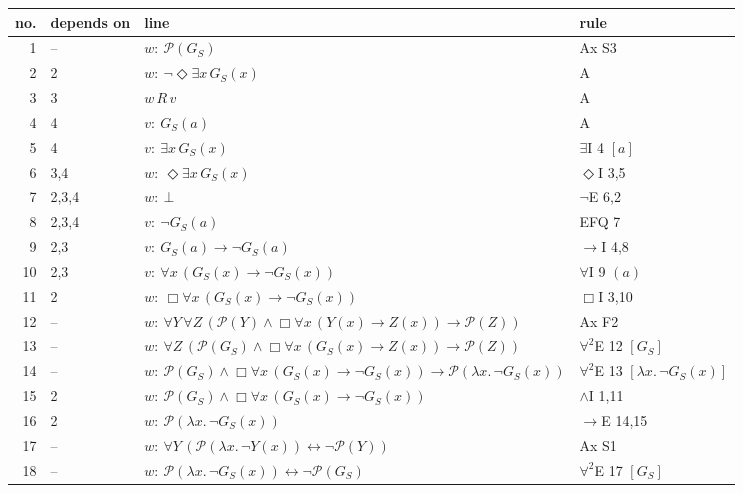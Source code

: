 {\footnotesize\setlength{\tabcolsep}{4pt}
\begin{longtable}{@{}r>{\raggedright}p{}p{}>{\raggedright\arraybackslash}p{}@{}}\toprule
no. & depends on & line & rule\\\midrule\endhead
1 & -- & $w:\ \mathcal{P}(G_{\!S})$ & Ax S3\\
2 & 2 & $w:\ \neg \Diamond \exists x\, G_{\!S}(x)$ & A\\
3 & 3 & $w\,R\,v$ & A\\
4 & 4 & $v:\ G_{\!S}(a)$ & A\\
5 & 4 & $v:\ \exists x\, G_{\!S}(x)$ & $\exists$I 4 $[a]$\\
6 & 3,4 & $w:\ \Diamond \exists x\, G_{\!S}(x)$ & $\Diamond$I 3,5\\
7 & 2,3,4 & $w:\ \bot$ & $\neg$E 6,2\\
8 & 2,3,4 & $v:\ \neg G_{\!S}(a)$ & EFQ 7\\
9 & 2,3 & $v:\ G_{\!S}(a) \to \neg G_{\!S}(a)$ & $\to$I 4,8\\
10 & 2,3 & $v:\ \forall x\, (G_{\!S}(x) \to \neg G_{\!S}(x))$ & $\forall$I 9 $(a)$\\
11 & 2 & $w:\ \Box \forall x\, (G_{\!S}(x) \to \neg G_{\!S}(x))$ & $\Box$I 3,10\\
12 & -- & $w:\ \forall Y\, \forall Z\, (\mathcal{P}(Y) \wedge \Box \forall x\, (Y(x) \to Z(x)) \to \mathcal{P}(Z))$ & Ax F2\\
13 & -- & $w:\ \forall Z\, (\mathcal{P}(G_{\!S}) \wedge \Box \forall x\, (G_{\!S}(x) \to Z(x)) \to \mathcal{P}(Z))$ & $\forall^2$E 12 $[G_{\!S}]$\\
14 & -- & $w:\ \mathcal{P}(G_{\!S}) \wedge \Box \forall x\, (G_{\!S}(x) \to \neg G_{\!S}(x)) \to \mathcal{P}(\lambda x.\,\neg G_{\!S}(x))$ & $\forall^2$E 13 $[\lambda x.\,\neg G_{\!S}(x)]$\\
15 & 2 & $w:\ \mathcal{P}(G_{\!S}) \wedge \Box \forall x\, (G_{\!S}(x) \to \neg G_{\!S}(x))$ & $\wedge$I 1,11\\
16 & 2 & $w:\ \mathcal{P}(\lambda x.\,\neg G_{\!S}(x))$ & $\to$E 14,15\\
17 & -- & $w:\ \forall Y\, (\mathcal{P}(\lambda x.\,\neg Y(x)) \leftrightarrow \neg \mathcal{P}(Y))$ & Ax S1\\
18 & -- & $w:\ \mathcal{P}(\lambda x.\,\neg G_{\!S}(x)) \leftrightarrow \neg \mathcal{P}(G_{\!S})$ & $\forall^2$E 17 $[G_{\!S}]$\\

\end{longtable}}
